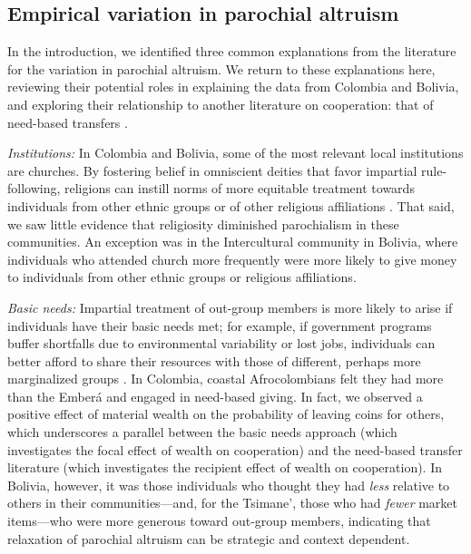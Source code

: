 \documentclass[bibauthoryear]{aa}
\begin{document}
\subsection{Empirical variation in parochial altruism}

In the introduction, we identified three common explanations from the literature for the variation in parochial altruism. We return to these explanations here, reviewing their potential roles in explaining the data from Colombia and Bolivia, and exploring their relationship to another literature on cooperation: that of need-based transfers \citep[e.g.,][]{peterson1993demand, hooper2015inclusive, aktipis2016cooperation, hao2015need, cronk2019managing}.

\emph{Institutions:} In Colombia and Bolivia, some of the most relevant local institutions are churches. By fostering belief in omniscient deities that favor impartial rule-following, religions can instill norms of more equitable treatment towards individuals from other ethnic groups or of other religious affiliations \citep{purzycki2018evolution, lang2019moralizing}. That said, we saw little evidence that religiosity diminished parochialism in these communities. An exception was in the Intercultural community in Bolivia, where individuals who attended church more frequently were more likely to give money to individuals from other ethnic groups or religious affiliations. 

\emph{Basic needs:} Impartial treatment of out-group members is more likely to arise if individuals have their basic needs met; for example, if government programs buffer shortfalls due to environmental variability or lost jobs, individuals can better afford to share their resources with those of different, perhaps more marginalized groups  \citep{hruschka2014impartial, silva2014cooperation}. In Colombia, coastal Afrocolombians felt they had more than the Ember\'a and  engaged in need-based giving. In fact, we observed a positive effect of material wealth on the probability of leaving coins for others, which underscores a parallel between the basic needs approach (which investigates the focal effect of wealth on cooperation) and the need-based transfer literature (which investigates the recipient effect of wealth on cooperation). In Bolivia, however, it was those individuals who thought they had \emph{less} relative to others in their communities---and, for the Tsimane', those who had \emph{fewer} market items---who were more generous toward out-group members, indicating that relaxation of parochial altruism can be strategic and context dependent.
\end{document}
